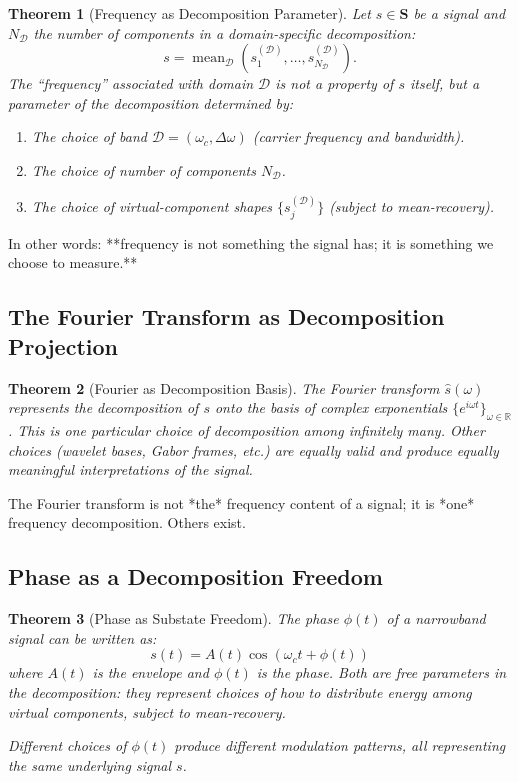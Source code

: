 \documentclass[twocolumn,11pt,a4paper]{article}
\newtheorem{theorem}{Theorem}[section]
\newcommand{\signal}{s}
\newcommand{\Signal}{\mathbf{S}}
\newcommand{\bandwidth}{\Delta\omega}
\newcommand{\domain}{\mathcal{D}}
\newcommand{\mean}{\operatorname{mean}}
\newcommand{\freq}{\omega}
\begin{document}
\begin{theorem}[Frequency as Decomposition Parameter]
Let $\signal \in \Signal$ be a signal and $N_\domain$ the number of components in a domain-specific decomposition:
\begin{equation}
  \signal = \mean_\domain(\signal_1^{(\domain)}, \ldots, \signal_{N_\domain}^{(\domain)}).
\end{equation}
The ``frequency'' associated with domain $\domain$ is not a property of $\signal$ itself, but a parameter of the decomposition determined by:
\begin{enumerate}[nosep,label=(\roman*)]
  \item The choice of band $\domain = (\freq_c, \bandwidth)$ (carrier frequency and bandwidth).
  \item The choice of number of components $N_\domain$.
  \item The choice of virtual-component shapes $\{\signal_j^{(\domain)}\}$ (subject to mean-recovery).
\end{enumerate}
\end{theorem}

In other words: **frequency is not something the signal has; it is something we choose to measure.**

\subsection{The Fourier Transform as Decomposition Projection}

\begin{theorem}[Fourier as Decomposition Basis]
The Fourier transform $\hat{\signal}(\freq)$ represents the decomposition of $\signal$ onto the basis of complex exponentials $\{e^{i\freq t}\}_{\freq \in \mathbb{R}}$. This is one particular choice of decomposition among infinitely many. Other choices (wavelet bases, Gabor frames, etc.) are equally valid and produce equally meaningful interpretations of the signal.
\end{theorem}

The Fourier transform is not *the* frequency content of a signal; it is *one* frequency decomposition. Others exist.

\subsection{Phase as a Decomposition Freedom}

\begin{theorem}[Phase as Substate Freedom]
The phase $\phi(t)$ of a narrowband signal can be written as:
\begin{equation}
  \signal(t) = A(t) \cos(\freq_c t + \phi(t))
\end{equation}
where $A(t)$ is the envelope and $\phi(t)$ is the phase. Both are free parameters in the decomposition: they represent choices of how to distribute energy among virtual components, subject to mean-recovery.

Different choices of $\phi(t)$ produce different modulation patterns, all representing the same underlying signal $\signal$.
\end{theorem}
\end{document}

